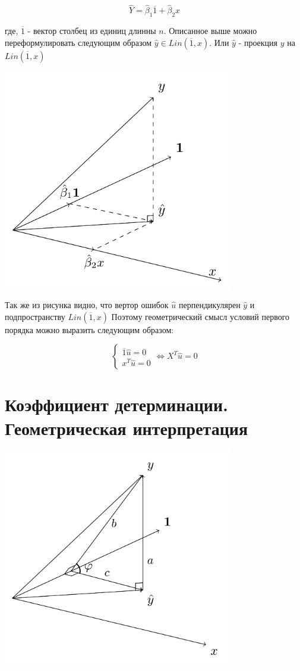\documentclass[12pt]{article} %
\theoremstyle{definition} %
\def \hb{\hat{\beta}}
\def \hy{\hat{y}}
\def \hY{\hat{Y}}
\def \hu{\hat{u}}
\begin{document}
\[
\hY = \hb_1 \overline{1} + \hb_2 x 
\]

где, $\overline{1}$ - вектор столбец из единиц длинны $n$.
Описанное выше можно переформулировать следующим образом $\hy \in Lin(\overline{1}, x)$. Или $\hy$ - проекция $y$ на $Lin(\overline{1}, x)$

\includegraphics[width=10cm]{02_averages_yhat_decomposed}

Так же из рисунка видно, что вертор ошибок $\hu$ перпендикулярен $\hy$ и подпространству $Lin(\overline{1}, x)$ Поэтому геометрический смысл условий первого порядка можно выразить следующим образом:

\begin{equation*}
 \begin{cases}
   \overline{1}\hu = 0 \\
   x^T\hu = 0
 \end{cases}
 \Leftrightarrow
 X^T\hu = 0
\end{equation*}

\section{Коэффициент детерминации. Геометрическая интерпретация}

\includegraphics[width=10cm]{02_determination_coefficient}
\end{document}
